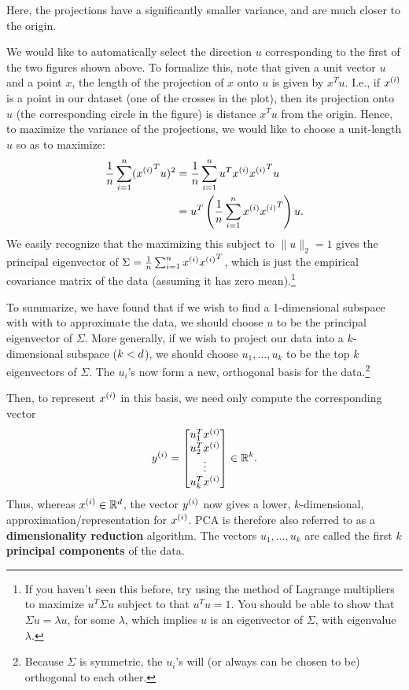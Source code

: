 \documentclass{article}
\begin{document}
Here, the projections have a significantly smaller variance, and are much closer to the origin.

We would like to automatically select the direction $u$ corresponding to the first of the two figures shown above. To formalize this, note that given a unit vector $u$ and a point $x$, the length of the projection of $x$ onto $u$ is given by $x^Tu$. I.e., if ${x^{(i)}}$ is a point in our dataset (one of the crosses in the plot), then its projection onto $u$ (the corresponding circle in the figure) is distance $x^Tu$ from the origin. Hence, to maximize the variance of the projections, we would like to choose a unit-length $u$ so as to maximize:
\begin{align*}
\frac{1}{{n}} \sum_{i=1}^{n} ({x^{(i)}}^T u)^2
&= \frac{1}{{n}} \sum_{i=1}^{n} u^T{x^{(i)}} {x^{(i)}} ^T u \\
&= u^T \left( \frac{1}{{n}} \sum_{i=1}^{n} {x^{(i)}} {x^{(i)}}^T \right) u.
\end{align*}
We easily recognize that the maximizing this subject to $\|u\|_2=1$ gives the
principal eigenvector of $\Sigma = \frac{1}{{n}} \sum_{i=1}^{n} {x^{(i)}} {x^{(i)}}^T$, which
is just the empirical covariance matrix of the data (assuming it has zero mean).\footnote{If you
haven't seen this before, try using the method of Lagrange multipliers to maximize
$u^T\Sigma u$ subject to that $u^Tu=1$. You should be able to show that $\Sigma u = \lambda u$,
for some $\lambda$, which implies $u$ is an eigenvector of $\Sigma$, with eigenvalue $\lambda$.}

To summarize, we have found that if we wish to find a 1-dimensional subspace with with to approximate the data, we should choose $u$ to be the principal eigenvector of $\Sigma$. More generally, if we wish to project our data into a $k$-dimensional subspace ($k < {d}$), we should choose $u_1, \ldots, u_k$ to be the top $k$ eigenvectors of $\Sigma$. The $u_i$'s now form a new, orthogonal basis for the data.\footnote{Because $\Sigma$ is symmetric, the $u_i$'s will (or always can be chosen to be) orthogonal to each other.}

Then, to represent ${x^{(i)}}$ in this basis, we need only compute the corresponding vector
\[
{y^{(i)}} = \begin{bmatrix}
    u_1^T {x^{(i)}} \\
    u_2^T {x^{(i)}} \\
    \vdots \\
    u_k^T {x^{(i)}}
\end{bmatrix}
\in {\mathbb R}^k.
\]
Thus, whereas ${x^{(i)}} \in {\mathbb R}^{d}$, the vector ${y^{(i)}}$ now gives a lower, $k$-dimensional, approximation/representation for ${x^{(i)}}$. PCA is therefore also referred to as a {\bf dimensionality reduction} algorithm. The vectors $u_1, \ldots, u_k$ are called the first $k$ {\bf principal components} of the data.
\end{document}

